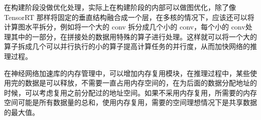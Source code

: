 在构建阶段没做优化处理，实际上在构建阶段的内部可以做图优化，除了像TensorRT 那样将固定的垂直结构融合成一个层，在多核的情况下，应该还可以将计算图水平拆分，例如将一个大的 conv 拆分成几个小的 conv，每个小的 conv处理其中的一部分，在拼接处的数据用特殊的算子进行处理。这样就可以将一个大的算子拆成几个可以并行执行的小的算子提高计算任务的并行度，从而加快网络的推理过程。

在神经网络加速库的内存管理中，可以增加内存复用模块，在推理过程中，某些使用完的数据是可以释放，不需要一直占用内存空间的，在为后面的数据分配地址的时候，可以考虑复用之前分配过的地址空间。如果不采用内存复用，所需要的内存空间可能是所有数据量的总和，使用内存复用，需要的空间理想情况下是共享数据的最大值。